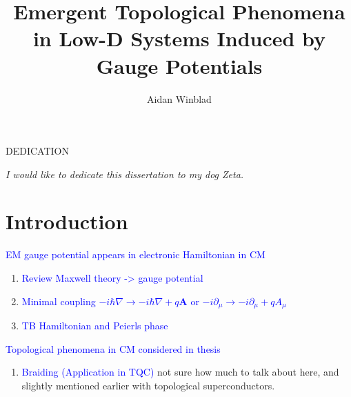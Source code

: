 \documentclass[12pt,doctor]{thesis}
\title{Emergent Topological Phenomena in Low-D Systems Induced by Gauge Potentials}
\author{Aidan Winblad}
\newcommand{\Blue}[1]{\textcolor{blue}{#1}}
\renewcommand{\vec}[1]{\mathbf{#1}}
\begin{document}
\frontmatter

\maketitle              %
\makemycopyright        %
\makeabstract           %
\makeacknowledgements   %

\begin{flatcenter} %

    DEDICATION

    \vfill %

    \noindent \textit{I would like to dedicate this dissertation to my dog Zeta.}
    \vfill %
\end{flatcenter}
\newpage

\tableofcontents    %
\listoftables       %
\listoffigures      %

\mainmatter %

\chapter{Introduction}
\Blue{EM gauge potential appears in electronic Hamiltonian in CM}
\begin{enumerate}
  \item \Blue{Review Maxwell theory -> gauge potential}
  \item \Blue{Minimal coupling $-i \hbar \nabla \rightarrow -i \hbar \nabla + q \vec{A}$ or $-i\partial_{\mu} \rightarrow -i\partial_{\mu} + qA_{\mu}$}
  \item \Blue{TB Hamiltonian and Peierls phase}
\end{enumerate}

\Blue{Topological phenomena in CM considered in thesis}






\begin{enumerate}
  \item \Blue{Braiding (Application in TQC)}
    not sure how much to talk about here, and slightly mentioned earlier with topological superconductors.
\end{enumerate}
\end{document}
